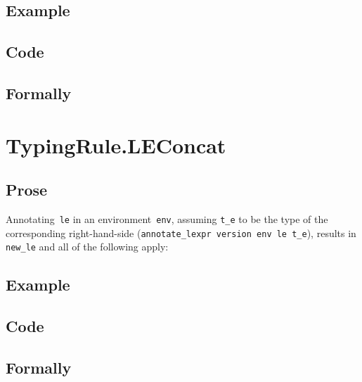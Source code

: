 \documentclass{book}
\begin{document}
  \subsection{Example}

  \subsection{Code}

\begin{emptyformal}
    \subsection{Formally}
\end{emptyformal}


\section{TypingRule.LEConcat \label{sec:TypingRule.LEConcat}}

    \subsection{Prose}
   Annotating~\texttt{le} in an environment~\texttt{env}, assuming
\texttt{t\_e} to be the type of the corresponding right-hand-side
(\texttt{annotate\_lexpr version env le t\_e}), results in \texttt{new\_le} and
all of the following apply:
     
  \subsection{Example}

  \subsection{Code}

\begin{emptyformal}
    \subsection{Formally}

\end{emptyformal}
\end{document}
